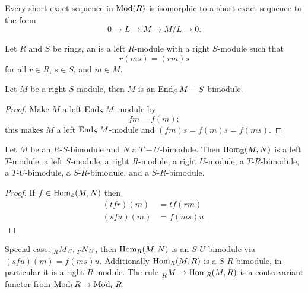   Every short exact sequence in $\operatorname{Mod}(R)$ is isomorphic to a short exact
  sequence to the form
  \[ 0 \to L \to M \to M/L \to 0. \]

  \begin{define}
    Let $R$ and $S$ be rings, an  is a left $R$-module
    with a right $S$-module such that
    \[ r(ms) = (rm)s \]
    for all $r\in R$, $s\in S$, and $m\in M$.
  \end{define}

  \begin{lemma}
    Let $M$ be a right $S$-module, then $M$ is an $\operatorname{End}_S{M}-S$-bimodule.
  \end{lemma}
  \begin{proof}
    Make $M$ a left $\operatorname{End}_S{M}$-module by
    \[ fm = f(m); \]
    this makes $M$ a left $\operatorname{End}_S{M}$-module and $(fm)s = f(m)s = f(ms)$.
  \end{proof}

  \begin{prop}
    Let $M$ be an $R$-$S$-bimodule and $N$ a $T-U$-bimodule. Then
    $\operatorname{Hom}_{\mathbb{Z}}(M,N)$ is a left $T$-module, a left $S$-module, a right
    $R$-module, a right $U$-module, a $T$-$R$-bimodule, a $T$-$U$-bimodule, a
    $S$-$R$-bimodule, and a $S$-$R$-bimodule.
  \end{prop}
  \begin{proof}
    If $f\in \operatorname{Hom}_{\mathbb{Z}}(M,N)$ then
    \begin{align*}
      (tfr)(m) &= tf(rm) \\
      (sfu)(m) &= f(ms)u.
    \end{align*}
  \end{proof}

  Special case: $\prescript{}{R}{M}_S, \prescript{}{T}{N}_U$, then $\operatorname{Hom}_R(M,N)$ is an
  $S$-$U$-bimodule via $(sfu)(m) = f(ms)u$. Additionally $\operatorname{Hom}_R(M,R)$ is a
  $S$-$R$-bimodule, in particular it is a right $R$-module. The rule
  $\prescript{}{R}{M} \to \operatorname{Hom}_R(M,R)$ is a contravariant functor from
  $\operatorname{Mod}_l R \to \operatorname{Mod}_r R$.
